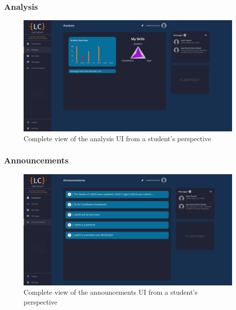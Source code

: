 \documentclass[a4paper, 12pt]{article}
\begin{document}
    
    
    
    
    
    
    
    
    
    
    
    \pagebreak
    
    \subsubsection{Analysis}
    
    \begin{figure}[H]
        \centering
        \includegraphics[width=\textwidth]{student_analysis}
        \caption{Complete view of the analysis UI from a student's perspective}
        \label{fig:student_analysis_full}
    \end{figure}
    
    
    
    
    
    
    
    
    
    
    
    \pagebreak
    
    \subsubsection{Announcements}
    
    \begin{figure}[H]
        \centering
        \includegraphics[width=\textwidth]{student_announcements}
        \caption{Complete view of the announcements UI from a student's perspective}
        \label{fig:student_announcements_full}
    \end{figure}
    
\end{document}
